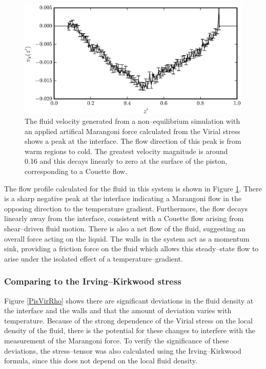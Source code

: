 \begin{figure}[h]
\centering
\includegraphics[scale=0.8]{PisVirFlow}
\caption{The fluid velocity generated from a non--equilibrium simulation with an applied artifical Marangoni force calculated from the Virial stress shows a peak at the interface.
The flow direction of this peak is from warm regions to cold.
The greatest velocity magnitude is around 0.16 and this decays linearly to zero at the surface of the piston, corresponding to a Couette flow.}
\label{PisVirFlow}
\end{figure}
The flow profile calculated for the fluid in this system is shown in Figure \ref{PisVirFlow}. 
There is a sharp negative peak at the interface indicating a Marangoni flow in the opposing direction to the temperature gradient.
Furthermore, the flow decays linearly away from the interface, consistent with a Couette flow arising from shear--driven fluid motion.\cite{FluidMech}
There is also a net flow of the fluid, suggesting an overall force acting on the liquid.
The walls in the system act as a momentum sink, providing a friction force on the fluid which allows this steady--state flow to arise under the isolated effect of a temperature--gradient.
\FloatBarrier

\subsubsection{Comparing to the Irving--Kirkwood stress}
Figure \ref{PisVirRho} shows there are significant deviations in the fluid density at the interface and the walls and that the amount of deviation varies with temperature.
Because of the strong dependence of the Virial stress on the local density of the fluid, there is the potential for these changes to interfere with the measurement of the Marangoni force.
To verify the significance of these deviations, the stress--tensor was also calculated using the Irving--Kirkwood formula, since this does not depend on the local fluid density.

